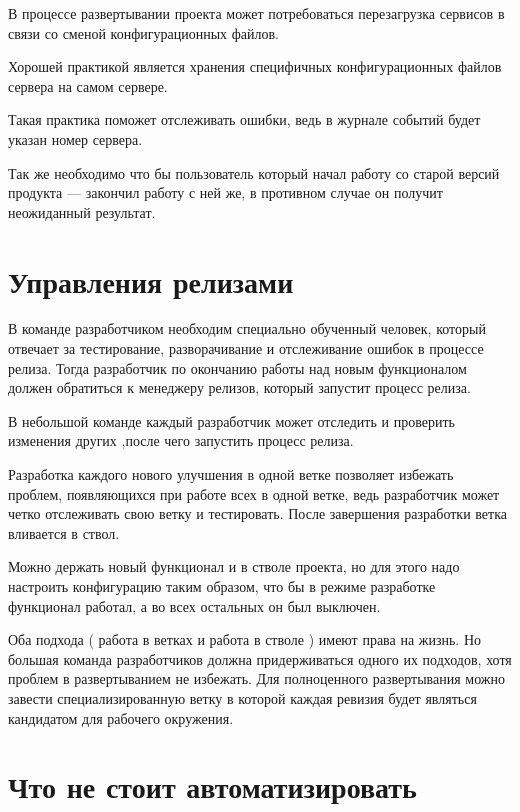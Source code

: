 
В процессе развертывании проекта может потребоваться перезагрузка сервисов в связи со сменой конфигурационных файлов.

Хорошей практикой является хранения специфичных конфигурационных файлов сервера на самом сервере.

 
 Такая практика поможет отслеживать ошибки, ведь в журнале событий будет указан номер сервера.
 
 Так же необходимо что бы пользователь который начал работу со старой версий продукта --- закончил работу с ней же, в противном случае он получит неожиданный результат.
 
 \section{ Управления релизами } \label{sect2_12}
 
 В команде разработчиком необходим специально обученный человек, который отвечает за тестирование, разворачивание и отслеживание ошибок в процессе релиза. Тогда разработчик по окончанию работы над новым функционалом должен обратиться к менеджеру релизов, который запустит процесс релиза.
 
 В небольшой команде каждый разработчик может отследить и проверить изменения других ,после чего запустить процесс релиза.
 
 Разработка каждого нового улучшения в одной ветке позволяет избежать проблем, появляющихся при работе всех в одной ветке, ведь разработчик может четко отслеживать свою ветку и тестировать. После завершения разработки ветка вливается в ствол.
 
 
 Можно держать новый функционал и в стволе проекта, но для этого надо настроить конфигурацию таким образом, что бы в режиме разработке функционал работал, а во всех остальных он был выключен.
 
 Оба подхода ( работа в ветках и работа в стволе ) имеют права на жизнь. Но большая команда разработчиков должна придерживаться одного их подходов, хотя проблем в развертыванием не избежать. Для полноценного развертывания можно завести специализированную ветку в которой каждая ревизия будет являться кандидатом для рабочего окружения.

   
\section{ Что не стоит автоматизировать} \label{sect2_13}

